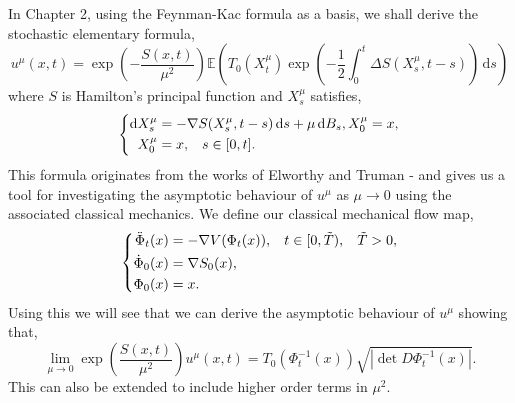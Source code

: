 \documentclass[a4paper,12pt,draft]{report}
\theoremstyle{remark}
\theoremstyle{definition}
\begin{document}
In Chapter 2, using the Feynman-Kac formula as a basis, we shall derive the stochastic elementary formula,
$$
u^\mu(x, t) = \exp\left(-\frac{S(x, t)}{\mu^2}\right)\mathbb{E}\left(T_0(X_t^\mu)\exp\left(-\frac{1}{2}\int_0^t\Delta S(X_s^\mu, t - s)\right)\,\mathrm{d}s\right)
$$
where $S$ is Hamilton's principal function and $X_s^\mu$ satisfies,
$$
\left\{
\begin{aligned}
\mathrm{d}X_s^\mu & = -\nabla S(X_s^\mu, t - s)\,\mathrm{d}s + \mu\,\mathrm{d}B_s, X_0^\mu = x, \\
X_0^\mu & = x, \hspace{0.3cm} s \in [0, t].
\end{aligned}
\right.
$$
This formula originates from the works of Elworthy and Truman \cite{SEF1} - \cite{SEF4} and gives us a tool for investigating the asymptotic behaviour of $u^\mu$ as $\mu \to 0$ using the associated classical mechanics.  We define our classical mechanical flow map,
$$
\left\{
\begin{aligned}
\ddot{\Phi}_t(x) & = -\nabla V(\Phi_t(x)), \hspace{0.3cm} t \in [0, \tilde{T}), \hspace{0.3cm} \tilde{T} > 0,\\
\dot{\Phi}_0(x) & = \nabla S_0(x), \\
\Phi_0(x) & = x.
\end{aligned}
\right.
$$
Using this we will see that we can derive the asymptotic behaviour of $u^\mu$ showing that,
$$
\lim_{\mu \to 0} \exp\left(\frac{S(x, t)}{\mu^2}\right)u^\mu(x, t) = T_0(\Phi_t^{-1}(x))\sqrt{|\det D\Phi_t^{-1}(x)|}.
$$
This can also be extended to include higher order terms in $\mu^2$.
\end{document}
